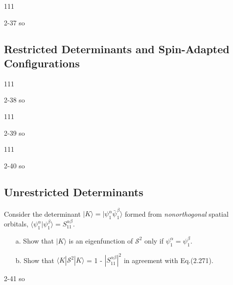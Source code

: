 \documentclass[a4paper]{book}
\begin{document}
	\begin{exercise}
	111
	\end{exercise}
	
	\begin{solution}
		2-37 so
	\end{solution}
	
	\subsection{Restricted Determinants and Spin-Adapted Configurations}
	
	\begin{exercise}
	111
	\end{exercise}
	
	\begin{solution}
		2-38 so
	\end{solution}
	
	\begin{exercise}
	111
	\end{exercise}
	
	\begin{solution}
		2-39 so
	\end{solution}
	
	\begin{exercise}
	111
	\end{exercise}
	
	\begin{solution}
		2-40 so
	\end{solution}
	
	\subsection{Unrestricted Determinants}
	
	\begin{exercise}
	Consider the determinant $| K \rangle = |\psi_1^\alpha \bar{\psi}^\beta_1 \rangle$ formed from {\it nonorthogonal} spatial orbitals, $\langle \psi^\alpha_1 | \psi^\beta_1 \rangle = S^{\alpha\beta}_{11}$. 
	\begin{enumerate}
	
	\item[a.] Show that $| K \rangle$ is an eigenfunction of $\mathscr{S}^2$ only if $\psi^\alpha_1 = \psi^\beta_1$.
	
	\item[b.] Show that $\langle K | \mathscr{S}^2 | K \rangle$ = 1 - $|S^{\alpha\beta}_{11}|^2$ in agreement with Eq.(2.271).	
	
	\end{enumerate}
	\end{exercise}
	
	\begin{solution}
		2-41 so
	\end{solution}
	
\end{document}
